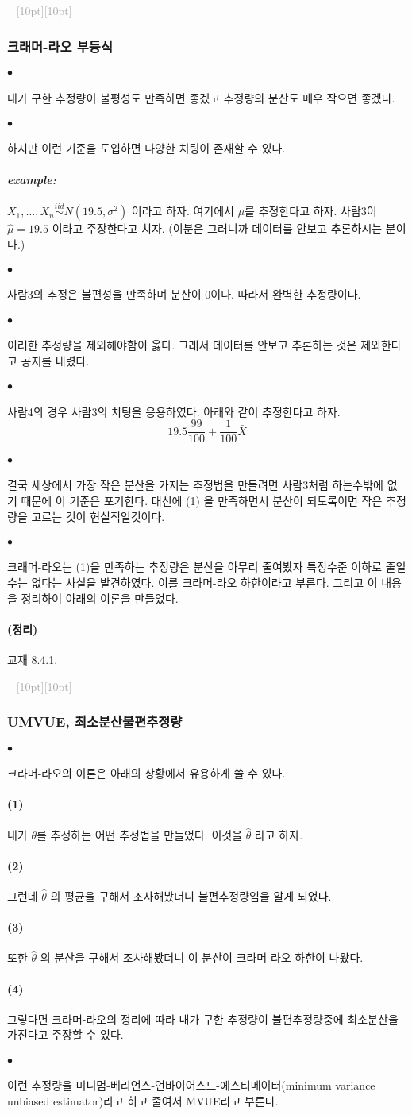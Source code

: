 \documentclass[12pt,oneside,english]{book}
\newcommand{\dash}{\vspace{2em}\noindent \textcolor{darkgray}{\hrulefill~ \raisebox{-2.5pt}[10pt][10pt]{\leafright \decofourleft \decothreeleft  \aldineright \decotwo \floweroneleft \decoone   \floweroneright \decotwo \aldineleft\decothreeright \decofourright \leafleft} ~  \hrulefill \\ \vspace{2em}}}
\def\ck{\paragraph{\Large$\bullet$}\Large}
\def\thm{\paragraph{\Large(정리)}\Large}
\def\ex{\paragraph{\Large\textit{example:}}\Large}
\def\one{\paragraph{\Large(1)}\Large}
\def\two{\paragraph{\Large(2)}\Large}
\def\three{\paragraph{\Large(3)}\Large}
\def\four{\paragraph{\Large(4)}\Large}
\begin{document}
\dash 

\subsubsection{크래머-라오 부등식}

\ck 내가 구한 추정량이 불평성도 만족하면 좋겠고 추정량의 분산도 매우 작으면 좋겠다. 

\ck 하지만 이런 기준을 도입하면 다양한 치팅이 존재할 수 있다. 

\ex $X_1,\dots,X_n \overset{iid}{\sim} N(19.5,\sigma^2)$ 이라고 하자. 여기에서 $\mu$를 추정한다고 하자. 사람3이 $\hat{\mu}=19.5$ 이라고 주장한다고 치자. (이분은 그러니까 데이터를 안보고 추론하시는 분이다.)

\ck 사람3의 추정은 불편성을 만족하며 분산이 0이다. 따라서 완벽한 추정량이다. 

\ck 이러한 추정량을 제외해야함이 옳다. 그래서 데이터를 안보고 추론하는 것은 제외한다고 공지를 내렸다. 

\ck 사람4의 경우 사람3의 치팅을 응용하였다. 아래와 같이 추정한다고 하자. 
\[
19.5 \frac{99}{100} + \frac{1}{100} \bar{X}
\]

\ck 결국 세상에서 가장 작은 분산을 가지는 추정법을 만들려면 사람3처럼 하는수밖에 없기 때문에 이 기준은 포기한다. 대신에 (1) 을 만족하면서 분산이 되도록이면 작은 추정량을 고르는 것이 현실적일것이다. 

\ck 크래머-라오는 (1)을 만족하는 추정량은 분산을 아무리 줄여봤자 특정수준 이하로 줄일수는 없다는 사실을 발견하였다. 이를 크라머-라오 하한이라고 부른다. 그리고 이 내용을 정리하여 아래의 이론을 만들었다. 

\thm 교재 8.4.1. 

\dash 

\subsubsection{UMVUE, 최소분산불편추정량}

\ck 크라머-라오의 이론은 아래의 상황에서 유용하게 쓸 수 있다. 

\one 내가 $\theta$를 추정하는 어떤 추정법을 만들었다. 이것을 $\hat\theta$ 라고 하자. 
\two 그런데 $\hat\theta$ 의 평균을 구해서 조사해봤더니 불편추정량임을 알게 되었다. 
\three 또한 $\hat\theta$ 의 분산을 구해서 조사해봤더니 이 분산이 크라머-라오 하한이 나왔다. 
\four 그렇다면 크라머-라오의 정리에 따라 내가 구한 추정량이 불편추정량중에 최소분산을 가진다고 주장할 수 있다. 

\ck 이런 추정량을 미니멈-베리언스-언바이어스드-에스티메이터(minimum variance unbiased estimator)라고 하고 줄여서 MVUE라고 부른다. 
\end{document}
